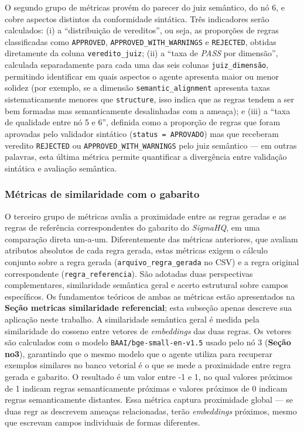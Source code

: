O segundo grupo de métricas provém do parecer do juiz semântico, do nó 6, e cobre aspectos distintos da conformidade sintática. 
Três indicadores serão calculados: (i) a ``distribuição de vereditos'', ou seja, as proporções de regras classificadas como \texttt{APPROVED}, \texttt{APPROVED\_WITH\_WARNINGS} e \texttt{REJECTED}, obtidas diretamente da coluna \texttt{veredito\_juiz}; (ii) a ``taxa de \textit{PASS} por dimensão'', calculada separadamente para cada uma das seis colunas \texttt{juiz\_\<dimensão\>}, permitindo identificar em quais aspectos o agente apresenta maior ou menor solidez (por exemplo, se a dimensão \texttt{semantic\_alignment} apresenta taxas sistematicamente menores que \texttt{structure}, isso indica que as regras tendem a ser bem formadas mas semanticamente desalinhadas com a ameaça); 
e (iii) a ``taxa de qualidade entre nó 5 e 6'', definida como a proporção de regras que foram aprovadas pelo validador sintático (\texttt{status = APROVADO}) mas que receberam veredito \texttt{REJECTED} ou \texttt{APPROVED\_WITH\_WARNINGS} pelo juiz semântico --- em outras palavras, esta última métrica permite quantificar a divergência entre validação sintática e avaliação semântica.


\subsubsection{Métricas de similaridade com o gabarito}\label{subsec:similaridade}

O terceiro grupo de métricas avalia a proximidade entre as regras geradas e as regras de referência correspondentes do gabarito do \textit{SigmaHQ}, em uma comparação direta um-a-um. 
Diferentemente das métricas anteriores, que avaliam atributos absolutos de cada regra gerada, estas métricas exigem o cálculo conjunto sobre a regra gerada (\texttt{arquivo\_regra\_gerada} no CSV) e a regra original correspondente (\texttt{regra\_referencia}). 
São adotadas duas perspectivas complementares, similaridade semântica geral e acerto estrutural sobre campos específicos. 
Os fundamentos teóricos de ambas as métricas estão apresentados na \textbf{Seção metricas similaridade referencial}; esta subseção apenas descreve sua aplicação neste trabalho.
A similaridade semântica geral é medida pela similaridade do cosseno entre vetores de \textit{embeddings} das duas regras. 
Os vetores são calculados com o modelo \texttt{BAAI/bge-small-en-v1.5} usado pelo nó 3 (\textbf{Seção no3}), garantindo que o mesmo modelo que o agente utiliza para recuperar exemplos similares no banco vetorial é o que se mede a proximidade entre regra gerada e gabarito. 
O resultado é um valor entre -1 e 1, no qual valores próximos de 1 indicam regras semanticamente próximas e valores próximos de 0 indicam regras semanticamente distantes. 
Essa métrica captura proximidade global --- se duas regr as descrevem ameaças relacionadas, terão \textit{embeddings} próximos, mesmo que escrevam campos individuais de formas diferentes.

